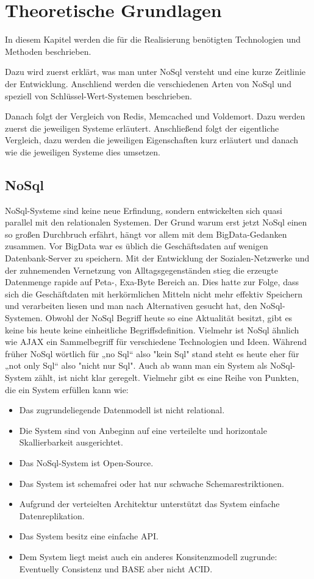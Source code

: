 \chapter{Theoretische Grundlagen}
In diesem Kapitel werden die für die Realisierung benötigten Technologien und
Methoden beschrieben.

Dazu wird zuerst erklärt, was man unter NoSql versteht und eine kurze Zeitlinie
der Entwicklung. Anschliend werden die verschiedenen Arten von NoSql und
speziell von Schlüssel-Wert-Systemen beschrieben.

Danach folgt der Vergleich von Redis, Memcached und Voldemort. Dazu werden
zuerst die jeweiligen Systeme erläutert. Anschließend folgt der eigentliche
Vergleich, dazu werden die jeweiligen Eigenschaften kurz erläutert und danach
wie die jeweiligen Systeme dies umsetzen.

\section{NoSql}
NoSql-Systeme sind keine neue Erfindung, sondern entwickelten sich quasi
parallel mit den relationalen Systemen. Der Grund warum erst jetzt NoSql einen
so großen Durchbruch erfährt, hängt vor allem mit dem BigData-Gedanken zusammen.
Vor BigData war es üblich die Geschäftsdaten auf wenigen Datenbank-Server zu
speichern. Mit der Entwicklung der Sozialen-Netzwerke und der zuhnemenden
Vernetzung von Alltagsgegenständen stieg die erzeugte Datenmenge rapide auf
Peta-, Exa-Byte Bereich an. Dies hatte zur Folge, dass sich die Geschäftdaten
mit herkörmlichen Mitteln nicht mehr effektiv Speichern und verarbeiten liesen
und man nach Alternativen gesucht hat, den NoSql-Systemen.
Obwohl der NoSql Begriff heute so eine Aktualität besitzt, gibt es keine bis
heute keine einheitliche Begriffsdefinition. Vielmehr ist NoSql ähnlich wie
AJAX ein Sammelbegriff für verschiedene Technologien und Ideen. Während früher
NoSql wörtlich für „no Sql“ also "kein Sql" stand steht es heute eher für
„not only Sql“ also "nicht nur Sql". Auch ab wann man ein System als
NoSql-System zählt, ist nicht klar geregelt. Vielmehr gibt es eine Reihe von
Punkten, die ein System erfüllen kann wie: \cite{Edlich2011}

\begin{itemize}
\item Das zugrundeliegende Datenmodell ist nicht relational.
\item Die System sind von Anbeginn auf eine verteilelte und horizontale
Skallierbarkeit ausgerichtet.
\item Das NoSql-System ist Open-Source.
\item Das System ist schemafrei oder hat nur schwache Schemarestriktionen.
\item Aufgrund der verteielten Architektur unterstützt das System einfache
Datenreplikation.
\item Das System besitz eine einfache API.
\item Dem System liegt meist auch ein anderes Konsitenzmodell zugrunde:
Eventuelly Consistenz und BASE aber nicht ACID.
\end{itemize}

